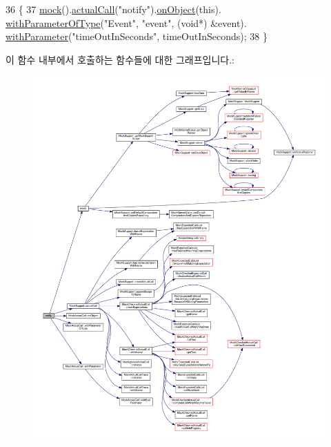 \begin{DoxyCode}
36     \{
37         \hyperlink{_mock_support_8h_ac44b0374b926cc12a3d8b24361f8a6a7}{mock}().\hyperlink{class_mock_support_a9b0ef024cdc513368395ef23d9e3af39}{actualCall}(\textcolor{stringliteral}{"notify"}).\hyperlink{class_mock_actual_call_a6bef5025448607c237bdffeb49cae588}{onObject}(\textcolor{keyword}{this}).
      \hyperlink{class_mock_actual_call_ad361afca601fb452b7182433f5727976}{withParameterOfType}(\textcolor{stringliteral}{"Event"}, \textcolor{stringliteral}{"event"}, (\textcolor{keywordtype}{void}*) &event).
      \hyperlink{class_mock_actual_call_a158f3ada8f73127b977d5353d4e4dea0}{withParameter}(\textcolor{stringliteral}{"timeOutInSeconds"}, timeOutInSeconds);
38     \}
\end{DoxyCode}


이 함수 내부에서 호출하는 함수들에 대한 그래프입니다.\+:
\nopagebreak
\begin{figure}[H]
\begin{center}
\leavevmode
\includegraphics[width=350pt]{class_observer_mock_a33d5ed8d4f2d29e41635c46680d8150d_cgraph}
\end{center}
\end{figure}


